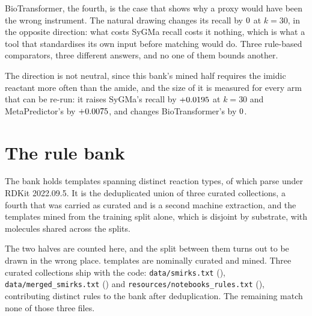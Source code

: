 \documentclass[journal=jcisd8,manuscript=suppinfo,layout=onecolumn]{achemso}
\begin{document}
BioTransformer, the fourth, is the case that shows why a proxy would have been the wrong
instrument. The natural drawing changes its recall by $0$ at $k=30$, in the
opposite direction: what costs SyGMa recall costs it nothing, which is what a tool that
standardises its own input before matching would do. Three rule-based comparators, three
different answers, and no one of them bounds another.


The direction is not
neutral, since this bank's mined half requires the imidic reactant more often than the amide, and
the size of it is measured for every arm that can be re-run: it raises SyGMa's recall by
$+0.0195$ at $k=30$ and MetaPredictor's by $+0.0075$, and changes
BioTransformer's by $0$.
\section{The rule bank}
\label{sec:si-bank}

The bank holds \numBankRules{} templates spanning \numBankTypes{} distinct reaction types, of
which \numBankParses{} parse under RDKit 2022.09.5. It is the deduplicated union of three curated
collections, a fourth that was carried as curated and is a second machine extraction, and the
templates mined from the training split alone, which is disjoint by substrate, with molecules
shared across the splits.

The two halves are counted here, and the split between them turns out to be
drawn in the wrong place. \numCuratedTotal{} templates are nominally curated and
\numMinedRules{} mined. Three curated collections ship with the code:
\texttt{data/smirks.txt} (\numCuratedHydroxylation{}), \texttt{data/merged\_smirks.txt}
(\numCuratedMerged{}) and \texttt{resources/notebooks\_rules.txt}
(\numCuratedNotebooks{}), contributing \numAttribNamed{} distinct rules to the bank after
deduplication. The remaining \numAttribUnattributed{} match none of those three files.
\end{document}
